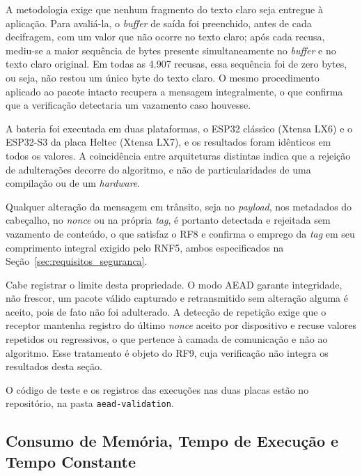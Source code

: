 A metodologia exige que nenhum fragmento do texto claro seja entregue à aplicação. Para avaliá-la, o \textit{buffer} de saída foi preenchido, antes de cada decifragem, com um valor que não ocorre no texto claro; após cada recusa, mediu-se a maior sequência de bytes presente simultaneamente no \textit{buffer} e no texto claro original. Em todas as 4.907 recusas, essa sequência foi de zero bytes, ou seja, não restou um único byte do texto claro. O mesmo procedimento aplicado ao pacote intacto recupera a mensagem integralmente, o que confirma que a verificação detectaria um vazamento caso houvesse.

A bateria foi executada em duas plataformas, o ESP32 clássico (Xtensa LX6) e o ESP32-S3 da placa Heltec (Xtensa LX7), e os resultados foram idênticos em todos os valores. A coincidência entre arquiteturas distintas indica que a rejeição de adulterações decorre do algoritmo, e não de particularidades de uma compilação ou de um \textit{hardware}.

Qualquer alteração da mensagem em trânsito, seja no \textit{payload}, nos metadados do cabeçalho, no \textit{nonce} ou na própria \textit{tag}, é portanto detectada e rejeitada sem vazamento de conteúdo, o que satisfaz o RF8 e confirma o emprego da \textit{tag} em seu comprimento integral exigido pelo RNF5, ambos especificados na Seção~\ref{sec:requisitos_seguranca}.

Cabe registrar o limite desta propriedade. O modo AEAD garante integridade, não frescor, um pacote válido capturado e retransmitido sem alteração alguma é aceito, pois de fato não foi adulterado. A detecção de repetição exige que o receptor mantenha registro do último \textit{nonce} aceito por dispositivo e recuse valores repetidos ou regressivos, o que pertence à camada de comunicação e não ao algoritmo. Esse tratamento é objeto do RF9, cuja verificação não integra os resultados desta seção.

O código de teste e os registros das execuções nas duas placas estão no repositório, na pasta \texttt{aead-validation}.


\subsection{Consumo de Memória, Tempo de Execução e Tempo Constante}
\label{subsec:memoria_tempo}

